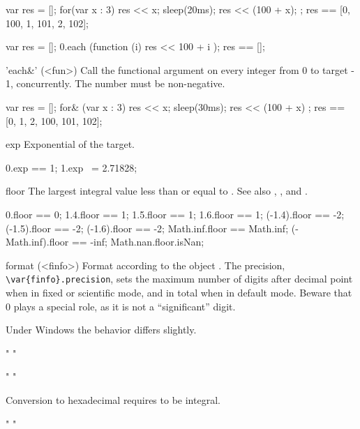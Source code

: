 \begin{urbiscriptapi}
\begin{urbiassert}
{
  var res = [];
  for(var x : 3) { res << x; sleep(20ms); res << (100 + x); };
  res
}
== [0, 100, 1, 101, 2, 102];

{
  var res = [];
  0.each (function (i) { res << 100 + i });
  res
}
== [];
\end{urbiassert}


\item['each&'](<fun>)%
  Call the functional argument  on every integer from 0 to
  target - 1, concurrently.  The number must be non-negative.
\begin{urbiassert}
{
  var res = [];
  for& (var x : 3) { res << x; sleep(30ms); res << (100 + x) };
  res
}
== [0, 1, 2, 100, 101, 102];
\end{urbiassert}%


\item[exp]
  Exponential of the target.
\begin{urbiassert}
0.exp == 1;
1.exp ~= 2.71828;
\end{urbiassert}


\item[floor] The largest integral value less than or equal to \this.  See
  also , , and .
\begin{urbiassert}
     0.floor ==  0;
   1.4.floor ==  1;     1.5.floor ==  1;    1.6.floor ==  1;
(-1.4).floor == -2;  (-1.5).floor == -2; (-1.6).floor == -2;
   Math.inf.floor == Math.inf; (-Math.inf).floor == -inf;
   Math.nan.floor.isNan;
\end{urbiassert}


\item[format](<finfo>)%
  Format according to the  object .
  The precision, \lstinline|\var{finfo}.precision|, sets the maximum
  number of digits after decimal point when in fixed or scientific
  mode, and in total when in default mode.  Beware that 0 plays a
  special role, as it is not a ``significant'' digit.

  \begin{windows}
    Under Windows the behavior differs slightly.
  \end{windows}
\begin{urbiassert}
"%
"%

"%
"%
\end{urbiassert}

  Conversion to hexadecimal requires \this to be integral.
\begin{urbiassert}
"%
"%


\end{urbiassert}
\end{urbiscriptapi}
